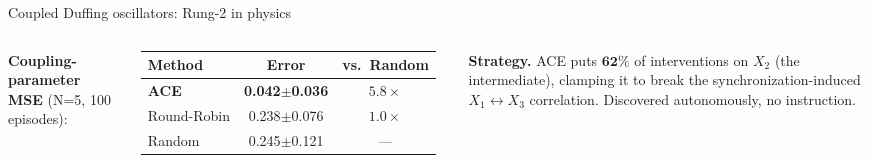 \documentclass[aspectratio=169,10pt]{beamer}
\begin{document}
\begin{frame}{Coupled Duffing oscillators: Rung-2 in physics}
\begin{columns}[T,onlytextwidth]
\centering
{}
\small
\textbf{Coupling-parameter MSE} (N=5, 100 episodes):
\medskip
\begin{tabular}{@{}lcc@{}}
\toprule
Method & Error & vs.\ Random \\
\midrule
\textbf{ACE} & \textbf{0.042$\pm$0.036} & $5.8\times$ \\
Round-Robin  & 0.238$\pm$0.076 & $1.0\times$ \\
Random       & 0.245$\pm$0.121 & --- \\
\bottomrule
\end{tabular}
\medskip
\textbf{Strategy.} ACE puts $\mathbf{62\%}$ of interventions on $X_2$ (the
intermediate), clamping it to break the synchronization-induced
$X_1\!\leftrightarrow\!X_3$ correlation. Discovered autonomously, no instruction.
\end{columns}
\end{frame}
\end{document}
